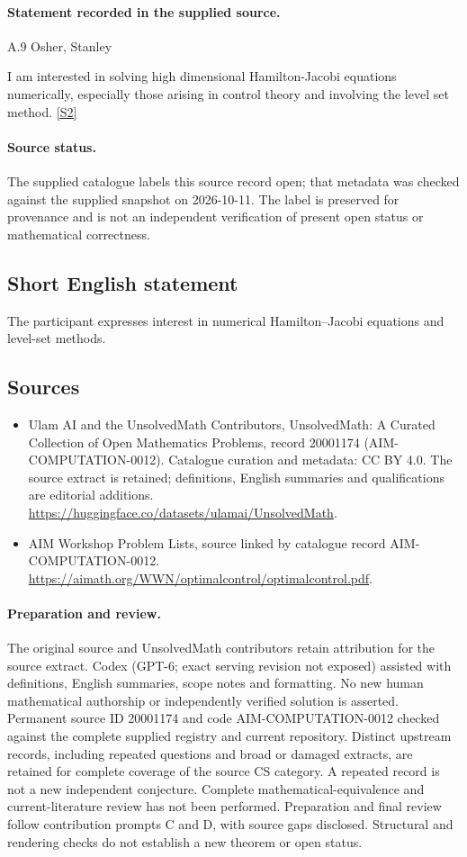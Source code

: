 \documentclass[11pt]{article}
\begin{document}
\paragraph{Statement recorded in the supplied source.}
A.9 Osher, Stanley

I am interested in solving high dimensional Hamilton-Jacobi equations numerically, especially those arising in control theory and involving the level set method. \href{https://aimath.org/WWN/optimalcontrol/optimalcontrol.pdf}{[S2]}
\paragraph{Source status.}
The supplied catalogue labels this source record open; that metadata was checked against the supplied snapshot on 2026-10-11. The label is preserved for provenance and is not an independent verification of present open status or mathematical correctness.
\subsection{Short English statement}
The participant expresses interest in numerical Hamilton--Jacobi equations and level-set methods.
\subsection{Sources}
\begin{itemize}
\item[S1] Ulam AI and the UnsolvedMath Contributors, UnsolvedMath: A Curated Collection of Open Mathematics Problems, record 20001174 (AIM-COMPUTATION-0012). Catalogue curation and metadata: CC BY 4.0. The source extract is retained; definitions, English summaries and qualifications are editorial additions.
\url{https://huggingface.co/datasets/ulamai/UnsolvedMath}.
\item[S2] AIM Workshop Problem Lists, source linked by catalogue record AIM-COMPUTATION-0012.
\url{https://aimath.org/WWN/optimalcontrol/optimalcontrol.pdf}.
\end{itemize}
\paragraph{Preparation and review.}
The original source and UnsolvedMath contributors retain attribution for the source extract. Codex (GPT-6; exact serving revision not exposed) assisted with definitions, English summaries, scope notes and formatting. No new human mathematical authorship or independently verified solution is asserted. Permanent source ID 20001174 and code AIM-COMPUTATION-0012 checked against the complete supplied registry and current repository. Distinct upstream records, including repeated questions and broad or damaged extracts, are retained for complete coverage of the source CS category. A repeated record is not a new independent conjecture. Complete mathematical-equivalence and current-literature review has not been performed. Preparation and final review follow contribution prompts C and D, with source gaps disclosed. Structural and rendering checks do not establish a new theorem or open status.
\label{end:20001174}
\end{document}
